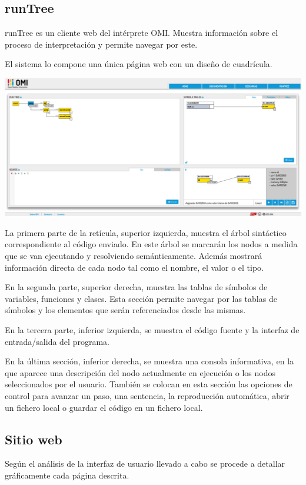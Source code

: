 \subsection{runTree}

runTree es un cliente web del intérprete OMI. Muestra información sobre el proceso de interpretación y permite navegar por este. 

El sistema lo compone una única página web con un diseño de cuadrícula.

\begin{center}
\includegraphics[scale=0.2]{runtree.png} \\
\end{center}

La primera parte de la retícula, superior izquierda, muestra el árbol sintáctico correspondiente al código enviado. En este árbol se marcarán los nodos a medida 
que se van ejecutando y resolviendo semánticamente. Además mostrará información directa de cada nodo tal como el nombre, el valor o el tipo.

En la segunda parte, superior derecha, muestra las tablas de símbolos de variables, funciones y clases. Esta sección permite navegar por las tablas de símbolos 
y los elementos que serán referenciados desde las mismas.

En la tercera parte, inferior izquierda, se muestra el código fuente y la interfaz de entrada/salida del programa.

En la última sección, inferior derecha, se muestra una consola informativa, en la que aparece una descripción del nodo actualmente en ejecución o 
los nodos seleccionados por el usuario. También se colocan en esta sección las opciones de control para avanzar un paso, una sentencia, la reproducción automática, abrir un fichero local o guardar el 
código en un fichero local. 

\subsection{Sitio web}
Según el análisis de la interfaz de usuario llevado a cabo se procede a detallar gráficamente cada página descrita.

